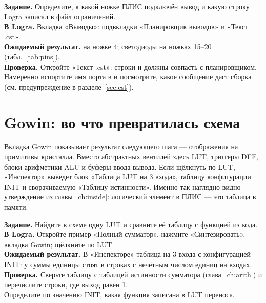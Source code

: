 \begin{diybox}
\textbf{Задание.} Определите, к какой ножке ПЛИС подключён вывод  и
какую строку Logra записал в файл ограничений.\\
\textbf{В Logra.} Вкладка «Выводы»: подвкладки «Планировщик выводов» и «Текст .cst».\\
\textbf{Ожидаемый результат.}  на ножке 4; светодиоды 
на ножках 15--20 (табл.~\ref{tab:pins}).\\
\textbf{Проверка.} Откройте «Текст .cst»: строки  и
 должны совпасть с планировщиком.\\
 Намеренно испортите имя порта в  и посмотрите, какое
сообщение даст сборка (см. предупреждение в разделе~\ref{sec:cst}).
\end{diybox}

\section{Gowin: во что превратилась схема}

Вкладка Gowin показывает результат следующего шага --- отображения на
примитивы кристалла. Вместо абстрактных вентилей здесь LUT, триггеры DFF,
блоки арифметики ALU и буферы ввода-вывода. Если щёлкнуть по LUT, «Инспектор»
выведет блок «Таблица LUT на 3 входа», таблицу конфигурации INIT и сворачиваемую
«Таблицу истинности». Именно так наглядно видно утверждение из
главы~\ref{ch:inside}: логический элемент в ПЛИС --- это таблица в памяти.


\begin{diybox}
\textbf{Задание.} Найдите в схеме одну LUT и сравните её таблицу с функцией из
кода.\\
\textbf{В Logra.} Откройте пример «Полный сумматор», нажмите «Синтезировать»,
вкладка Gowin; щёлкните по LUT.\\
\textbf{Ожидаемый результат.} В «Инспекторе» таблица на 3 входа с
конфигурацией INIT: у суммы  единицы стоят в строках
с нечётным числом единиц на входах.\\
\textbf{Проверка.} Сверьте таблицу с таблицей истинности сумматора (глава~\ref{ch:arith}) и
перечислите строки, где выход равен 1.\\
 Определите по значению INIT, какая функция записана в LUT переноса.
\end{diybox}

